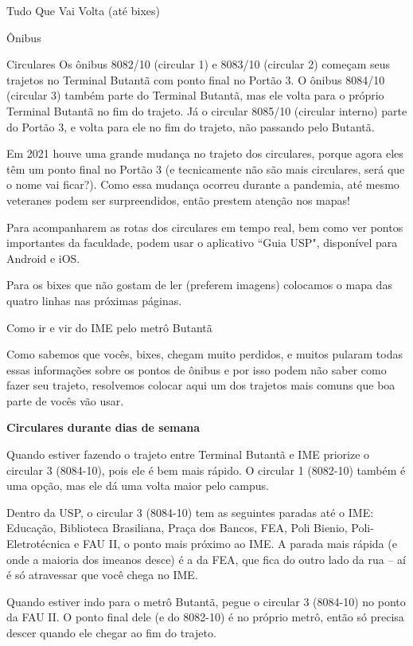 \begin{secao}{Tudo Que Vai Volta (até bixes)}
\begin{subsecao}{Ônibus}
\begin{subsubsecao}{Circulares}
Os ônibus 8082/10 (circular 1) e 8083/10 (circular 2) começam seus trajetos no 
Terminal Butantã com ponto final no Portão 3. O ônibus 8084/10 (circular 3) também 
parte do Terminal Butantã, mas ele volta para o próprio Terminal Butantã no fim do trajeto. 
Já o circular 8085/10 (circular interno) parte do Portão 3, e volta para ele no fim 
do trajeto, não passando pelo Butantã.

Em 2021 houve uma grande mudança no trajeto dos circulares, porque agora eles
têm um ponto final no Portão 3 (e tecnicamente não são mais circulares, será que
o nome vai ficar?). Como essa mudança ocorreu durante a pandemia, até mesmo
veteranes podem ser surpreendidos, então prestem atenção nos mapas!

Para acompanharem as rotas dos circulares em tempo real, bem como ver pontos
importantes da faculdade, podem usar o aplicativo ``Guia USP", disponível para
Android e iOS.

Para os bixes que não gostam de ler (preferem imagens) colocamos o
mapa das quatro linhas nas próximas páginas.



\end{subsubsecao}

\begin{subsubsecao}{Como ir e vir do IME pelo metrô Butantã}

Como sabemos que vocês, bixes, chegam muito perdidos, e muitos pularam todas
essas informações sobre os pontos de ônibus e por isso podem não saber como
fazer seu trajeto, resolvemos colocar aqui um dos trajetos mais comuns que boa
parte de vocês vão usar.

{\bf Circulares durante dias de semana}

Quando estiver fazendo o trajeto entre Terminal Butantã e IME priorize o circular 3
(8084-10), pois ele é bem mais rápido. O circular 1 (8082-10) também é uma opção, mas
ele dá uma volta maior pelo campus.

Dentro da USP, o circular 3 (8084-10) tem as seguintes paradas até o IME: Educação, 
Biblioteca Brasiliana, Praça dos Bancos, FEA, Poli Bienio, Poli-Eletrotécnica e FAU II,
o ponto mais próximo ao IME. A parada mais rápida (e onde a maioria dos imeanos desce) 
é a da FEA, que fica do outro lado da rua -- aí é só atravessar que você chega no IME.

Quando estiver indo para o metrô Butantã, pegue o circular 3 (8084-10) no ponto da FAU II.
O ponto final dele (e do 8082-10) é no próprio metrô, então só precisa descer quando ele 
chegar ao fim do trajeto.


\end{subsubsecao}
\end{subsecao}
\end{secao}

